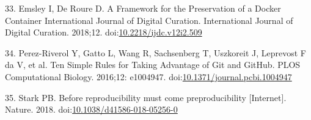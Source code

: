 \documentclass[10pt,letterpaper]{article}
\begin{document}
\leavevmode\hypertarget{ref-emsley_framework_2018}{}%
33. Emsley I, De Roure D. A Framework for the Preservation of a Docker
Container International Journal of Digital Curation. International
Journal of Digital Curation. 2018;12.
doi:\href{https://doi.org/10.2218/ijdc.v12i2.509}{10.2218/ijdc.v12i2.509}

\leavevmode\hypertarget{ref-perez-riverol_ten_2016}{}%
34. Perez-Riverol Y, Gatto L, Wang R, Sachsenberg T, Uszkoreit J,
Leprevost F da V, et al. Ten Simple Rules for Taking Advantage of Git
and GitHub. PLOS Computational Biology. 2016;12: e1004947.
doi:\href{https://doi.org/10.1371/journal.pcbi.1004947}{10.1371/journal.pcbi.1004947}

\leavevmode\hypertarget{ref-stark_before_2018}{}%
35. Stark PB. Before reproducibility must come preproducibility
{[}Internet{]}. Nature. 2018.
doi:\href{https://doi.org/10.1038/d41586-018-05256-0}{10.1038/d41586-018-05256-0}

\nolinenumbers
\end{document}
